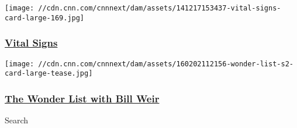 \href{/specials/health/vital-signs}{}

\texttt{[image: //cdn.cnn.com/cnnnext/dam/assets/141217153437-vital-signs-card-large-169.jpg]}

\hypertarget{vital-signs}{%
\subsubsection{\texorpdfstring{\href{/specials/health/vital-signs}{Vital
Signs}}{Vital Signs}}\label{vital-signs}}

\href{/shows/wonder-list}{}

\texttt{[image: //cdn.cnn.com/cnnnext/dam/assets/160202112156-wonder-list-s2-card-large-tease.jpg]}

\hypertarget{the-wonder-list-with-bill-weir}{%
\subsubsection{\texorpdfstring{\href{/shows/wonder-list}{The Wonder List
with Bill
Weir}}{The Wonder List with Bill Weir}}\label{the-wonder-list-with-bill-weir}}

Search

